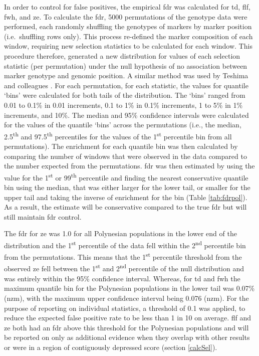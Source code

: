 \documentclass[twoside,openright]{report}
\begin{document}
In order to control for false positives, the empirical \gls{fdr} was
calculated for \gls{td}, \gls{flf}, \gls{fwh}, and \gls{ze}. To
calculate the \gls{fdr}, 5000 permutations of the genotype data were
performed, each randomly shuffling the genotypes of markers by marker
position (i.e.~shuffling rows only). This process re-defined the marker
composition of each window, requiring new selection statistics to be
calculated for each window. This procedure therefore, generated a new
distribution for values of each selection statistic (per permutation)
under the null hypothesis of no association between marker genotype and
genomic position. A similar method was used by Teshima and colleagues
\citeyearpar{Teshima2006}. For each permutation, for each statistic, the
values for quantile `bins' were calculated for both tails of the
distribution. The `bins' ranged from 0.01 to 0.1\% in 0.01 increments,
0.1 to 1\% in 0.1\% increments, 1 to 5\% in 1\% increments, and 10\%.
The median and 95\% confidence intervals were calculated for the values
of the quantile `bins' across the permutations (i.e., the median,
2.5\textsuperscript{th} and 97.5\textsuperscript{th} percentiles for the
values of the 1\textsuperscript{st} percentile bin from all
permutations). The enrichment for each quantile bin was then calculated
by comparing the number of windows that were observed in the data
compared to the number expected from the permutations. \Gls{fdr} was
then estimated by using the value for the 1\textsuperscript{st} or
99\textsuperscript{th} percentile and finding the nearest conservative
quantile bin using the median, that was either larger for the lower
tail, or smaller for the upper tail and taking the inverse of enrichment
for the bin (Table \ref{tab:fdrpol}). As a result, the estimate will be
conservative compared to the true \gls{fdr} but will still maintain
\gls{fdr} control.

The \gls{fdr} for \gls{ze} was 1.0 for all Polynesian populations in the
lower end of the distribution and the 1\textsuperscript{st} percentile
of the data fell within the 2\textsuperscript{nd} percentile bin from
the permutations. This means that the 1\textsuperscript{st} percentile
threshold from the observed \gls{ze} fell between the
1\textsuperscript{st} and 2\textsuperscript{nd} percentile of the null
distribution and was entirely within the 95\% confidence interval.
Whereas, for \gls{td} and \gls{fwh} the maximum quantile bin for the
Polynesian populations in the lower tail was 0.07\% (\gls{nzm}), with
the maximum upper confidence interval being 0.076 (\gls{nzm}). For the
purpose of reporting on individual statistics, a threshold of 0.1 was
applied, to reduce the expected false positive rate to be less than 1 in
10 on average. \Gls{flf} and \gls{ze} both had an \gls{fdr} above this
threshold for the Polynesian populations and will be reported on only as
additional evidence when they overlap with other results or were in a
region of contiguously depressed score (section \ref{calcSel}).
\end{document}
